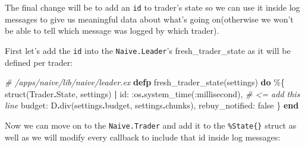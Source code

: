 \documentclass[
  oneside]{book}
\newenvironment{Shaded}{\begin{snugshade}}{\end{snugshade}}
\newcommand{\CommentTok}[1]{\textcolor[rgb]{0.56,0.35,0.01}{\textit{#1}}}
\newcommand{\ConstantTok}[1]{\textcolor[rgb]{0.00,0.00,0.00}{#1}}
\newcommand{\KeywordTok}[1]{\textcolor[rgb]{0.13,0.29,0.53}{\textbf{#1}}}
\newcommand{\NormalTok}[1]{#1}
\newcommand{\OperatorTok}[1]{\textcolor[rgb]{0.81,0.36,0.00}{\textbf{#1}}}
\newcommand{\VariableTok}[1]{\textcolor[rgb]{0.00,0.00,0.00}{#1}}
\begin{document}
The final change will be to add an \texttt{id} to trader's state so we can use it inside log messages to give us meaningful data about what's going on(otherwise we won't be able to tell which message was logged by which trader).

First let's add the \texttt{id} into the \texttt{Naive.Leader}'s fresh\_trader\_state as it will be defined per trader:

\begin{Shaded}
\begin{Highlighting}[]
  \CommentTok{\# /apps/naive/lib/naive/leader.ex}
  \KeywordTok{defp}\NormalTok{ fresh\_trader\_state(settings) }\KeywordTok{do}
\NormalTok{    \%\{}
\NormalTok{      struct(}\ConstantTok{Trader}\OperatorTok{.}\ConstantTok{State}\NormalTok{, settings)}
      \OperatorTok{|} \VariableTok{id:} \VariableTok{:os}\OperatorTok{.}\NormalTok{system\_time(}\VariableTok{:millisecond}\NormalTok{), }\CommentTok{\# \textless{}= add this line}
        \VariableTok{budget:}\NormalTok{ D}\OperatorTok{.}\NormalTok{div(settings}\OperatorTok{.}\NormalTok{budget, settings}\OperatorTok{.}\NormalTok{chunks),}
        \VariableTok{rebuy\_notified:} \ConstantTok{false}
\NormalTok{    \}}
  \KeywordTok{end}
\end{Highlighting}
\end{Shaded}

Now we can move on to the \texttt{Naive.Trader} and add it to the \texttt{\%State\{\}} struct as well as we will modify every callback to include that id inside log messages:
\end{document}

